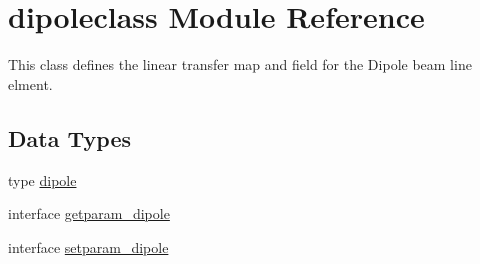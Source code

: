 \hypertarget{namespacedipoleclass}{}\section{dipoleclass Module Reference}
\label{namespacedipoleclass}


This class defines the linear transfer map and field for the Dipole beam line elment.  


\subsection*{Data Types}
\begin{DoxyCompactItemize}
\item 
type \mbox{\hyperlink{namespacedipoleclass_structdipoleclass_1_1dipole}{dipole}}
\item 
interface \mbox{\hyperlink{interfacedipoleclass_1_1getparam__dipole}{getparam\+\_\+dipole}}
\item 
interface \mbox{\hyperlink{interfacedipoleclass_1_1setparam__dipole}{setparam\+\_\+dipole}}
\end{DoxyCompactItemize}
